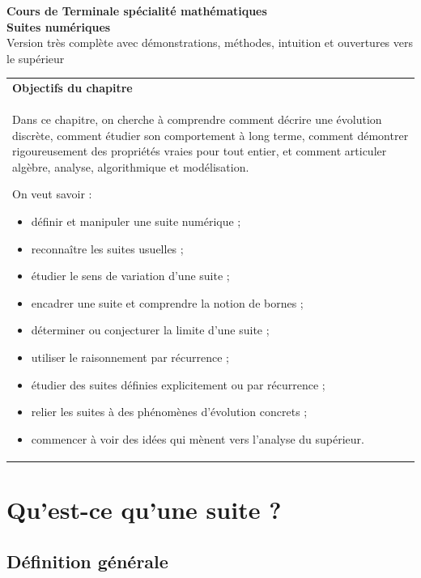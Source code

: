 \documentclass[11pt,a4paper]{article}
\theoremstyle{definition}
\theoremstyle{plain}
\theoremstyle{remark}
\newenvironment{encadre}[1]
{\begin{center}
\begin{tabular}{|p{0.93\textwidth}|}
\hline
\textbf{#1} \\
}
{\\ \hline
\end{tabular}
\end{center}}
\begin{document}
\begin{center}
    {\LARGE \textbf{Cours de Terminale spécialité mathématiques}}\\[0.2cm]
    {\Huge \textbf{Suites numériques}}\\[0.3cm]
    {\large Version très complète avec démonstrations, méthodes, intuition et ouvertures vers le supérieur}
\end{center}

\vspace{0.4cm}

\begin{encadre}{Objectifs du chapitre}
Dans ce chapitre, on cherche à comprendre comment décrire une évolution discrète, comment étudier son comportement à long terme, comment démontrer rigoureusement des propriétés vraies pour tout entier, et comment articuler algèbre, analyse, algorithmique et modélisation.

On veut savoir :
\begin{itemize}[leftmargin=0.8cm]
    \item définir et manipuler une suite numérique ;
    \item reconnaître les suites usuelles ;
    \item étudier le sens de variation d'une suite ;
    \item encadrer une suite et comprendre la notion de bornes ;
    \item déterminer ou conjecturer la limite d'une suite ;
    \item utiliser le raisonnement par récurrence ;
    \item étudier des suites définies explicitement ou par récurrence ;
    \item relier les suites à des phénomènes d'évolution concrets ;
    \item commencer à voir des idées qui mènent vers l'analyse du supérieur.
\end{itemize}
\end{encadre}

\tableofcontents
\newpage

\section{Qu'est-ce qu'une suite ?}

\subsection{Définition générale}
\end{document}
